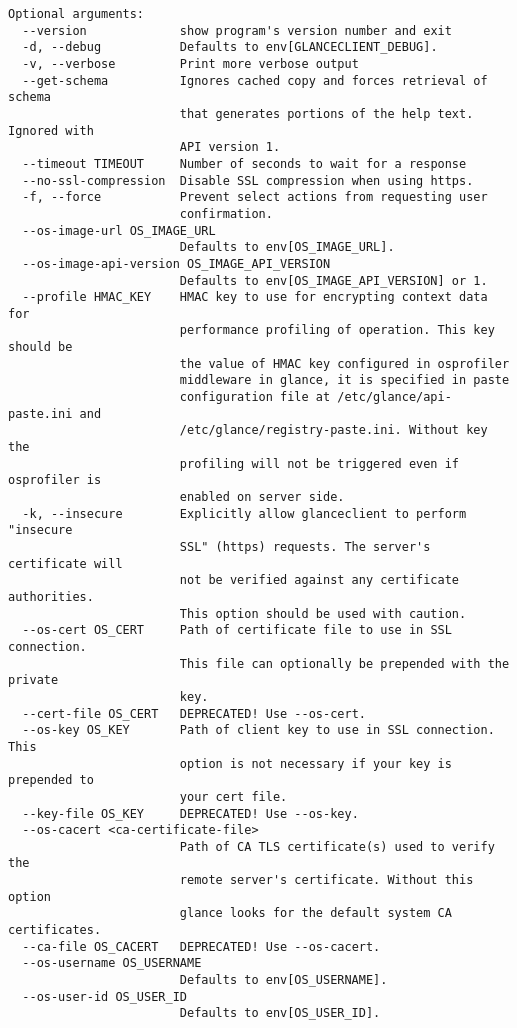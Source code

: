 \documentclass[a4paper,left=1.5cm,right=1.5cm,11pt]{article}
\begin{document}
\begin{lstlisting}
Optional arguments:
  --version             show program's version number and exit
  -d, --debug           Defaults to env[GLANCECLIENT_DEBUG].
  -v, --verbose         Print more verbose output
  --get-schema          Ignores cached copy and forces retrieval of schema
                        that generates portions of the help text. Ignored with
                        API version 1.
  --timeout TIMEOUT     Number of seconds to wait for a response
  --no-ssl-compression  Disable SSL compression when using https.
  -f, --force           Prevent select actions from requesting user
                        confirmation.
  --os-image-url OS_IMAGE_URL
                        Defaults to env[OS_IMAGE_URL].
  --os-image-api-version OS_IMAGE_API_VERSION
                        Defaults to env[OS_IMAGE_API_VERSION] or 1.
  --profile HMAC_KEY    HMAC key to use for encrypting context data for
                        performance profiling of operation. This key should be
                        the value of HMAC key configured in osprofiler
                        middleware in glance, it is specified in paste
                        configuration file at /etc/glance/api-paste.ini and
                        /etc/glance/registry-paste.ini. Without key the
                        profiling will not be triggered even if osprofiler is
                        enabled on server side.
  -k, --insecure        Explicitly allow glanceclient to perform "insecure
                        SSL" (https) requests. The server's certificate will
                        not be verified against any certificate authorities.
                        This option should be used with caution.
  --os-cert OS_CERT     Path of certificate file to use in SSL connection.
                        This file can optionally be prepended with the private
                        key.
  --cert-file OS_CERT   DEPRECATED! Use --os-cert.
  --os-key OS_KEY       Path of client key to use in SSL connection. This
                        option is not necessary if your key is prepended to
                        your cert file.
  --key-file OS_KEY     DEPRECATED! Use --os-key.
  --os-cacert <ca-certificate-file>
                        Path of CA TLS certificate(s) used to verify the
                        remote server's certificate. Without this option
                        glance looks for the default system CA certificates.
  --ca-file OS_CACERT   DEPRECATED! Use --os-cacert.
  --os-username OS_USERNAME
                        Defaults to env[OS_USERNAME].
  --os-user-id OS_USER_ID
                        Defaults to env[OS_USER_ID].

\end{lstlisting}
\end{document}
